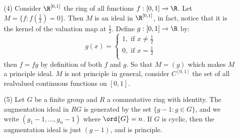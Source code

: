 \begin{example}
\begin{enumerate}
         \item[(4)] Consider $\R^{[0,1]}$ the ring of all functions $f:[0,1]
             \xrightarrow{} \R$. Let $M=\{f : f(\frac{1}{2})=0\}$. Then $M$ is
             an ideal in $\R^{[0,1]}$, in fact, notice that it is the kernel of
             the valuation map at $\frac{1}{2}$. Define $g:[0,1] \xrightarrow{}
             \R$ by:
             \begin{equation*}
                     g(x)=\begin{cases}
                             1, \text{ if } x \neq \frac{1}{2}  \\
                             0, \text{ if } x=\frac{1}{2}   \\
                          \end{cases}
             \end{equation*}
             then $f=fg$ by definition of both  $f$ and $g$. So that $M=(g)$
             which makes $M$ a principle ideal. $M$ is not principle in general,
             consider $C^{[0,1]}$ the set of all realvalued continuous functions
             on $[0,1]$.

         \item[(5)] Let $G$ be a finite group and  $R$ a commutative ring with
             identity. The augmentation ideal in $RG$ is generated by the set
             $\{g-1 : g \in G\}$, and we write $(g_1-1, \dots, g_n-1)$ where
             $\ord{G}=n$. If $G$ is cyclic, then the augmentation ideal is just
              $(g-1)$, and is principle.
    \end{enumerate}
\end{example}

